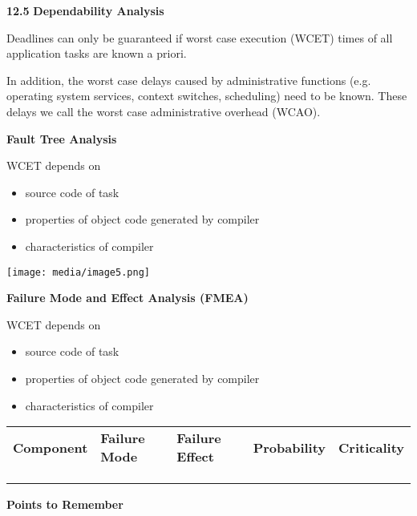 \textbf{12.5} \protect\hypertarget{teil6}{}{}\textbf{Dependability
Analysis}

Deadlines can only be guaranteed if worst case execution (WCET) times of
all application tasks are known a priori.

In addition, the worst case delays caused by administrative functions
(e.g. operating system services, context switches, scheduling) need to
be known. These delays we call the worst case administrative overhead
(WCAO).

\textbf{Fault Tree Analysis}

WCET depends on

\begin{itemize}
\item
  source code of task
\item
  properties of object code generated by compiler
\item
  characteristics of compiler
\end{itemize}

\texttt{[image: media/image5.png]}

\textbf{Failure Mode and Effect Analysis (FMEA)}

WCET depends on

\begin{itemize}
\item
  source code of task
\item
  properties of object code generated by compiler
\item
  characteristics of compiler
\end{itemize}

\begin{longtable}[c]{@{}lllll@{}}
\toprule
\textbf{Component} & \textbf{Failure Mode} & \textbf{Failure Effect} &
\textbf{Probability} & \textbf{Criticality}\tabularnewline
& & & &\tabularnewline
& & & &\tabularnewline
& & & &\tabularnewline
\bottomrule
\end{longtable}

\protect\hypertarget{teil9}{}{}\textbf{Points to Remember}
